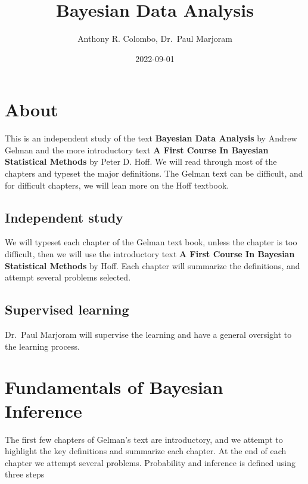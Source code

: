 \documentclass[
]{book}
\title{Bayesian Data Analysis}
\author{Anthony R. Colombo, Dr.~Paul Marjoram}
\date{2022-09-01}
\theoremstyle{definition}
\theoremstyle{definition}
\theoremstyle{definition}
\theoremstyle{definition}
\theoremstyle{remark}
\begin{document}
\maketitle

{
\setcounter{tocdepth}{1}
\tableofcontents
}
\hypertarget{about}{%
\chapter*{About}\label{about}}

This is an independent study of the text \textbf{Bayesian Data Analysis} by Andrew Gelman and the more introductory text \textbf{A First Course In Bayesian Statistical Methods} by Peter D. Hoff. We will read through most of the chapters and typeset the major definitions. The Gelman text can be difficult, and for difficult chapters, we will lean more on the Hoff textbook.

\hypertarget{independent-study}{%
\section*{Independent study}\label{independent-study}}

We will typeset each chapter of the Gelman text book, unless the chapter is too difficult, then we will use the introductory text \textbf{A First Course In Bayesian Statistical Methods} by Hoff. Each chapter will summarize the definitions, and attempt several problems selected.

\hypertarget{supervised-learning}{%
\section*{Supervised learning}\label{supervised-learning}}

Dr.~Paul Marjoram will supervise the learning and have a general oversight to the learning process.

\hypertarget{fundamentals-of-bayesian-inference}{%
\chapter{Fundamentals of Bayesian Inference}\label{fundamentals-of-bayesian-inference}}

The first few chapters of Gelman's text are introductory, and we attempt to highlight the key definitions and summarize each chapter. At the end of each chapter we attempt several problems. Probability and inference is defined using three steps
\end{document}
